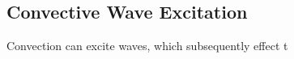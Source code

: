 {\color{purple}
\subsection{Convective Wave Excitation}
}

Convection can excite waves, which subsequently effect t
